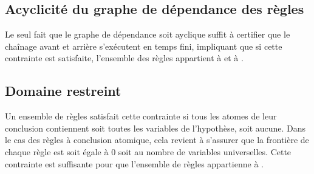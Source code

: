 \subsection{Acyclicité du graphe de dépendance des règles}\label{classe_agrd}
Le seul fait que le graphe de dépendance soit ayclique suffit à certifier que le chaînage
avant et arrière s'exécutent en temps fini, impliquant que si cette contrainte est satisfaite,
l'ensemble des règles appartient à \fes et à \fus.

\subsection{Domaine restreint}\label{classe_dr}
Un ensemble de règles satisfait cette contrainte si tous les atomes de leur conclusion
contiennent soit toutes les variables de l'hypothèse, soit aucune.
Dans le cas des règles à conclusion atomique, cela revient à s'assurer que la frontière
de chaque règle est soit égale à 0 soit au nombre de variables universelles.
Cette contrainte est suffisante pour que l'ensemble de règles appartienne à \fus.


